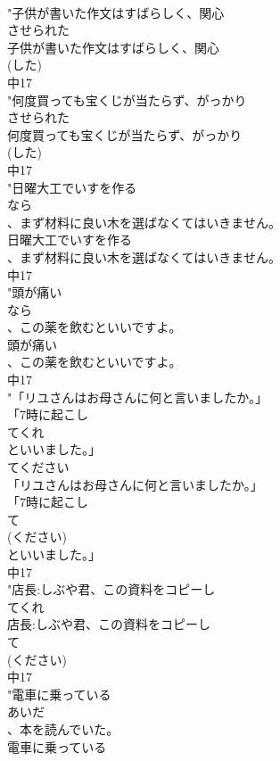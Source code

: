 \documentclass[8pt]{extreport}
\begin{document}
\begin{CJK}{UTF8}{min}
\\	"子供が書いた作文はすばらしく、関心
\\	させられた
\\	子供が書いた作文はすばらしく、関心
\\	(した)
\\	中17
\\	"何度買っても宝くじが当たらず、がっかり
\\	させられた
\\	何度買っても宝くじが当たらず、がっかり
\\	(した)
\\	中17
\\	"日曜大工でいすを作る
\\	なら
\\	、まず材料に良い木を選ばなくてはいきません。
\\	日曜大工でいすを作る
\\	、まず材料に良い木を選ばなくてはいきません。
\\	中17
\\	"頭が痛い
\\	なら
\\	、この薬を飲むといいですよ。
\\	頭が痛い
\\	、この薬を飲むといいですよ。
\\	中17
\\	"「リユさんはお母さんに何と言いましたか。」
\\	「7時に起こし
\\	てくれ
\\	といいました。」
\\	てください	
\\	「リユさんはお母さんに何と言いましたか。」
\\	「7時に起こし
\\	て
\\	(ください)
\\	といいました。」
\\	中17
\\	"店長:しぶや君、この資料をコピーし
\\	てくれ
\\	店長:しぶや君、この資料をコピーし
\\	て
\\	(ください)
\\	中17
\\	"電車に乗っている
\\	あいだ
\\	、本を読んでいた。
\\	電車に乗っている

\end{CJK}
\end{document}
